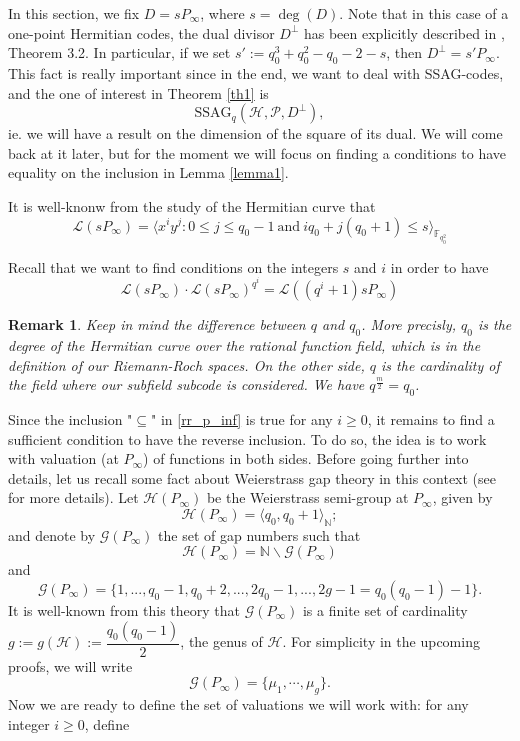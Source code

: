 \documentclass[a4paper]{article}
\newtheorem{rq1}{Remark}
\newcommand{\calP}{\mathcal{P}}
\newcommand{\calH}{\mathcal{H}}
\newcommand{\calL}{\mathcal{L}}
\begin{document}
In this section, we fix $D=sP_{\infty}$, where $s=\deg(D)$. Note that in this case of a one-point Hermitian codes, the dual divisor $D^{\perp}$ has been explicitly described in \cite{sabi}, Theorem 3.2. In particular, if we set $s' := q_0^3+q_0^2-q_0-2-s$, then $D^{\perp} = s'P_{\infty}$. This fact is really important since in the end, we want to deal with \textrm{SSAG}-codes, and the one of interest in Theorem \ref{th1} is 
\[\mathrm{SSAG}_{q}(\calH,\calP,D^{\perp}),\]
ie. we will have a result on the dimension of the square of its dual. We will come back at it later, but for the moment we will focus on finding a conditions to have equality on the inclusion in Lemma \ref{lemma1}. 

\noindent It is well-knonw from the study of the Hermitian curve that
\begin{equation} \label{rr_p_inf}
\calL(sP_{\infty}) = \langle x^iy^j : 0 \leq j \leq q_0-1 \ \mathrm{and} \ iq_0+j(q_0+1) \leq s \rangle_{\mathbb{F}_{q_0^2}}
\end{equation}

Recall that we want to find conditions on the integers $s$ and $i$ in order to have 
\begin{equation} \label{equality}
\calL(sP_{\infty}) \cdot \calL(sP_{\infty})^{q^i} = \calL((q^i+1)sP_{\infty})  
\end{equation}

\begin{rq1}
Keep in mind the difference between $q$ and $q_0$. More precisly, $q_0$ is the degree of the Hermitian curve over the rational function field, which is in the definition of our Riemann-Roch spaces. On the other side, $q$ is the cardinality of the field where our subfield subcode is considered. We have $q^{\frac{m}{2}}=q_0$.
\end{rq1}

Since the inclusion "$\subseteq$" in \eqref{rr_p_inf} is true for any $i \geq 0$, it remains to find a sufficient condition to have the reverse inclusion. To do so, the idea is to work with valuation (at $P_{\infty}$) of functions in both sides. Before going further into details, let us recall some fact about Weierstrass gap theory in this context (see \cite{sti} for more details).
Let $\calH(P_{\infty})$ be the Weierstrass semi-group at $P_{\infty}$, given by
\[\calH(P_{\infty}) = \langle q_0,q_0+1 \rangle_{\mathbb{N}};\]
and denote by  $\mathcal{G}(P_{\infty})$ the set of gap numbers such that
\[\calH(P_{\infty}) = \mathbb{N} \backslash \mathcal{G}(P_{\infty})\]
and 
\[\mathcal{G}(P_{\infty}) = \{1,...,q_0-1,q_0+2,...,2q_0-1,...,2g-1=q_0(q_0-1)-1\}.\]
It is well-known from this theory that $\mathcal{G}(P_{\infty})$ is a finite set of cardinality $g:=g(\calH) := \dfrac{q_0(q_0-1)}{2}$, the genus of $\calH$. For simplicity in the upcoming proofs, we will write 
\[\mathcal{G}(P_{\infty}) = \{\mu_1,\cdots,\mu_g\}.\]
Now we are ready to define the set of valuations we will work with: for any integer $i \geq 0$, define
\end{document}
